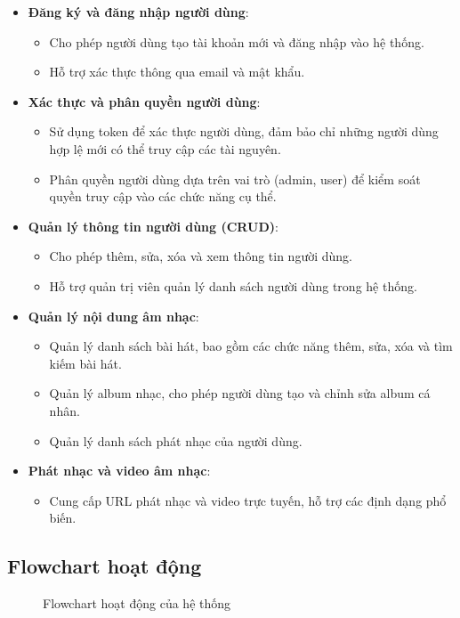 \begin{itemize}
    \item \textbf{Đăng ký và đăng nhập người dùng}:
    \begin{itemize}
        \item Cho phép người dùng tạo tài khoản mới và đăng nhập vào hệ thống.
        \item Hỗ trợ xác thực thông qua email và mật khẩu.
    \end{itemize}
    \item \textbf{Xác thực và phân quyền người dùng}:
    \begin{itemize}
        \item Sử dụng token để xác thực người dùng, đảm bảo chỉ những người dùng hợp lệ mới có thể truy cập các tài nguyên.
        \item Phân quyền người dùng dựa trên vai trò (admin, user) để kiểm soát quyền truy cập vào các chức năng cụ thể.
    \end{itemize}
    \item \textbf{Quản lý thông tin người dùng (CRUD)}:
    \begin{itemize}
        \item Cho phép thêm, sửa, xóa và xem thông tin người dùng.
        \item Hỗ trợ quản trị viên quản lý danh sách người dùng trong hệ thống.
    \end{itemize}
    \item \textbf{Quản lý nội dung âm nhạc}:
    \begin{itemize}
        \item Quản lý danh sách bài hát, bao gồm các chức năng thêm, sửa, xóa và tìm kiếm bài hát.
        \item Quản lý album nhạc, cho phép người dùng tạo và chỉnh sửa album cá nhân.
        \item Quản lý danh sách phát nhạc của người dùng.
    \end{itemize}
    \item \textbf{Phát nhạc và video âm nhạc}:
    \begin{itemize}
        \item Cung cấp URL phát nhạc và video trực tuyến, hỗ trợ các định dạng phổ biến.
    \end{itemize}
\end{itemize}


\subsection{Flowchart hoạt động}
\begin{figure}[h]
    \centering
    \caption{Flowchart hoạt động của hệ thống}
\end{figure}

